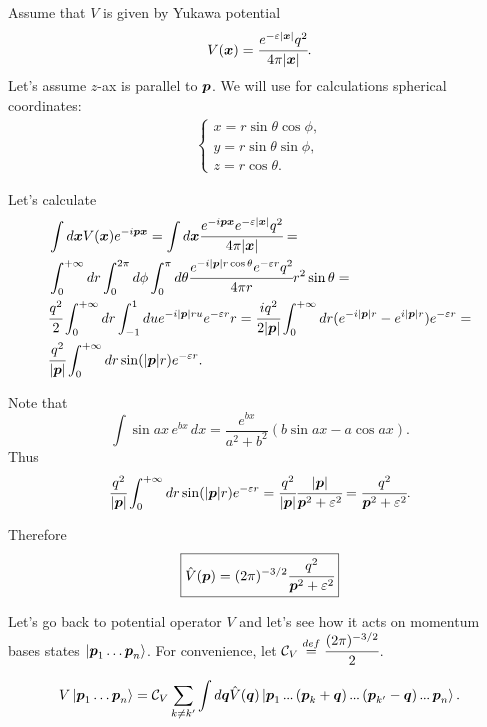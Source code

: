 \documentclass[main.tex]{subfiles}
\begin{document}
Assume that $V$ is given by Yukawa potential
\begin{equation}
V(\bs{x}) = \cfrac{e^{-\eepsilon|\bs{x}|}q^2}{4\pi |\bs{x}|}.
\end{equation}
Let's assume $z$-ax is parallel to $\boldsymbol{p}$. We will use for calculations spherical coordinates:
\begin{align*}
\begin{cases}
x = r\sin\theta \cos\phi,\\
y = r\sin\theta \sin\phi,\\
z = r\cos\theta.
\end{cases}
\end{align*}

Let's calculate
\begin{align*}
& \int d\bs{x} V(\bs{x}) e^{-i\bs{p}\bs{x}} = \int d\bs{x} \cfrac{e^{-i\bs{p}\bs{x}} e^{-\eepsilon|\bs{x}|}q^2}{4\pi |\bs{x}|} = \\
& \int_0^{+\infty} dr \int_0^{2\pi} d\phi \int_0^{\pi} d\theta
\cfrac{e^{-i|\bs{p}|r \cos\theta} e^{-\eepsilon r}q^2}{4\pi r} r^2 \sin\theta = \\
& \cfrac{q^2}{2} \int_0^{+\infty} dr \int^{1}_{-1} du 
e^{-i|\bs{p}|ru} e^{-\eepsilon r}r = \cfrac{iq^2}{2|\bs{p}|}\int_0^{+\infty} dr (e^{-i|\bs{p}|r} - e^{i|\bs{p}|r})e^{-\eepsilon r} = \\
& \cfrac{q^2}{|\bs{p}|} \int_0^{+\infty} dr \sin(|\bs{p}|r) e^{-\eepsilon r}.
\end{align*}

Note that
\begin{equation}
\int \sin ax\, e^{bx}\, dx = \frac{e^{bx}}{a^2+b^2}\left( b\sin ax - a\cos ax \right).
\end{equation}
Thus
\begin{equation}
\cfrac{q^2}{|\bs{p}|} \int_0^{+\infty} dr \sin(|\bs{p}|r) e^{-\eepsilon r} = \cfrac{q^2}{|\bs{p}|} \cfrac{|\bs{p}|}{\bs{p}^2 + \eepsilon^2} = \cfrac{q^2}{\bs{p}^2 + \eepsilon^2}.
\end{equation}

Therefore
\begin{equation}
\boxed{
\hat{V}(\bs{p}) = (2\pi)^{-3/2} \cfrac{q^2}{\bs{p}^2 + \eepsilon^2}
}
\end{equation}

Let's go back to potential operator $V$ and let's see how it acts on momentum bases states $\ket{\boldsymbol{p}_1\dots \boldsymbol{p}_n}$. For convenience, let $\mathcal{C}_V \stackrel{def}{=} \cfrac{(2\pi)^{-3/2}}{2}$.

\begin{equation}
V \ket{\bs{p}_1\dots \bs{p}_n} = \mathcal{C}_V \sum_{k\not=k'} \int d\bs{q} \hat{V}(\bs{q}) \ket{\bs{p}_1 \tdots (\bs{p}_k + \bs{q}) \tdots (\bs{p}_{k'} - \bs{q}) \tdots \bs{p}_n}.
\end{equation} 
\end{document}

